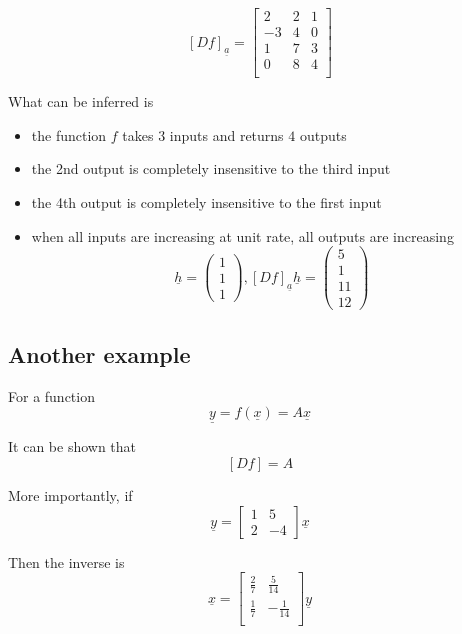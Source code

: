 \[
   [Df]_{ \underline{a}} = \begin{bmatrix} 
      2 & 2 & 1\\
      -3 & 4 & 0\\
      1 & 7 & 3\\
      0 & 8 & 4\\
   \end{bmatrix}
\] 

What can be inferred is
\begin{itemize}
   \item the function $f$ takes $3$ inputs and returns $4$ outputs
   \item the 2nd output is completely insensitive to the third input
   \item the 4th output is completely insensitive to the first input
   \item when all inputs are increasing at unit rate, all outputs are increasing\[
         \underline{h} = \begin{pmatrix} 1 \\ 1 \\ 1 \end{pmatrix} , [Df]_{ \underline{a}} \underline{h} = \begin{pmatrix} 5 \\ 1 \\ 11 \\ 12 \end{pmatrix} 
   \] 
\end{itemize}

\subsection{Another example}
For a function
\[
  \underline{y} = f ( \underline{x}) = A \underline{x}
\] 

It can be shown that 
\[
   [Df] = A
\] 

More importantly, if 
\[
  \underline{y} = \begin{bmatrix} 
     1 & 5 \\ 2 & -4  
  \end{bmatrix} \underline{x}
\] 

Then the inverse is\[
  \underline{x} = \begin{bmatrix} 
     \frac{2}{7} & \frac{5}{14} \\
     \frac{1}{7} & - \frac{1}{14} \\
  \end{bmatrix} \underline{y}
\] 

